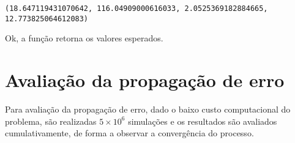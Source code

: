     \begin{Verbatim}[commandchars=\\\{\}]
(18.647119431070642, 116.04909000616033, 2.0525369182884665, 12.773825064612083)
    \end{Verbatim}

    Ok, a função retorna os valores esperados.

    \hypertarget{avaliauxe7uxe3o-da-propagauxe7uxe3o-de-erro}{%
\section{Avaliação da propagação de
erro}\label{avaliauxe7uxe3o-da-propagauxe7uxe3o-de-erro}}

Para avaliação da propagação de erro, dado o baixo custo computacional
do problema, são realizadas \(5 \times 10^6\) simulações e os resultados
são avaliados cumulativamente, de forma a observar a convergência do
processo.

